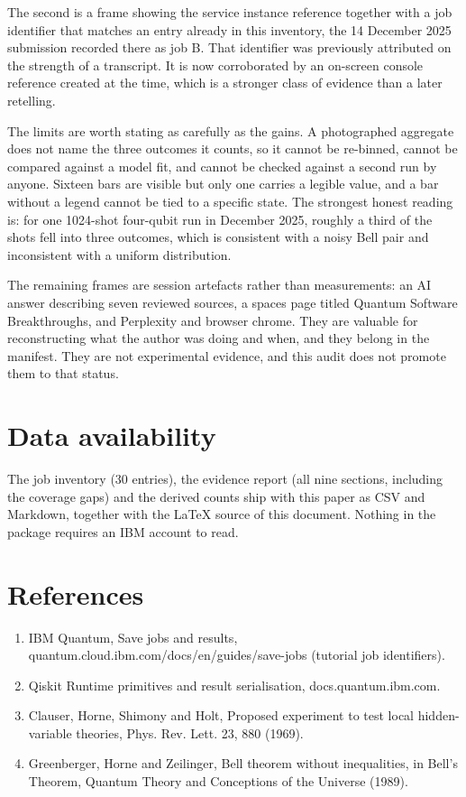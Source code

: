 \documentclass[11pt]{article}
\begin{document}
The second is a frame showing the service instance reference together with a job identifier that matches an entry already in this inventory, the 14 December 2025 submission recorded there as job B. That identifier was previously attributed on the strength of a transcript. It is now corroborated by an on-screen console reference created at the time, which is a stronger class of evidence than a later retelling.

The limits are worth stating as carefully as the gains. A photographed aggregate does not name the three outcomes it counts, so it cannot be re-binned, cannot be compared against a model fit, and cannot be checked against a second run by anyone. Sixteen bars are visible but only one carries a legible value, and a bar without a legend cannot be tied to a specific state. The strongest honest reading is: for one 1024-shot four-qubit run in December 2025, roughly a third of the shots fell into three outcomes, which is consistent with a noisy Bell pair and inconsistent with a uniform distribution.

The remaining frames are session artefacts rather than measurements: an AI answer describing seven reviewed sources, a spaces page titled Quantum Software Breakthroughs, and Perplexity and browser chrome. They are valuable for reconstructing what the author was doing and when, and they belong in the manifest. They are not experimental evidence, and this audit does not promote them to that status.

\section*{Data availability}
The job inventory (30 entries), the evidence report (all nine sections, including the coverage gaps) and the derived counts ship with this paper as CSV and Markdown, together with the LaTeX source of this document. Nothing in the package requires an IBM account to read.

\section*{References}\begin{enumerate}
\item IBM Quantum, Save jobs and results, quantum.cloud.ibm.com/docs/en/guides/save-jobs (tutorial job identifiers).
\item Qiskit Runtime primitives and result serialisation, docs.quantum.ibm.com.
\item Clauser, Horne, Shimony and Holt, Proposed experiment to test local hidden-variable theories, Phys. Rev. Lett. 23, 880 (1969).
\item Greenberger, Horne and Zeilinger, Bell theorem without inequalities, in Bell's Theorem, Quantum Theory and Conceptions of the Universe (1989).
\end{enumerate}
\end{document}
